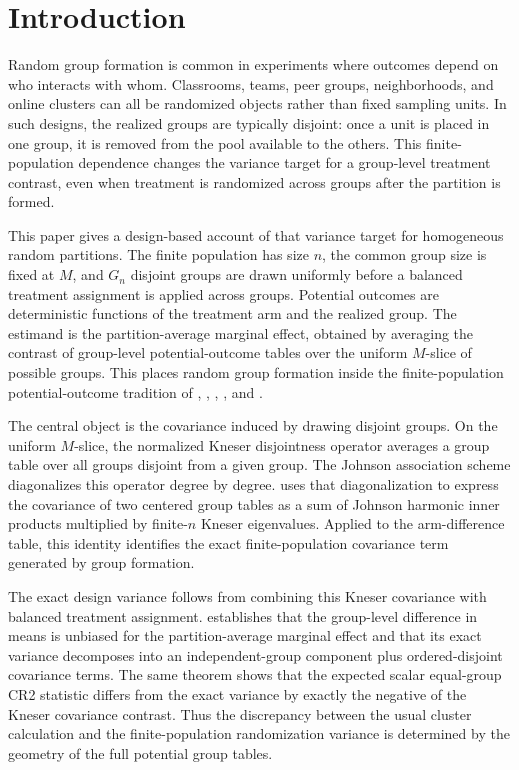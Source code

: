 \documentclass[11pt]{article}
\begin{document}
\section{Introduction}

Random group formation is common in experiments where outcomes depend on who interacts with whom. Classrooms, teams, peer groups, neighborhoods, and online clusters can all be randomized objects rather than fixed sampling units. In such designs, the realized groups are typically disjoint: once a unit is placed in one group, it is removed from the pool available to the others. This finite-population dependence changes the variance target for a group-level treatment contrast, even when treatment is randomized across groups after the partition is formed.

This paper gives a design-based account of that variance target for homogeneous random partitions. The finite population has size \(n\), the common group size is fixed at \(M\), and \(G_n\) disjoint groups are drawn uniformly before a balanced treatment assignment is applied across groups. Potential outcomes are deterministic functions of the treatment arm and the realized group. The estimand is the partition-average marginal effect, obtained by averaging the contrast of group-level potential-outcome tables over the uniform \(M\)-slice of possible groups. This places random group formation inside the finite-population potential-outcome tradition of \citet{Neyman1923}, \citet{Fisher1935}, \citet{Cox1958}, \citet{Rubin1974}, and \citet{Holland1986}.

The central object is the covariance induced by drawing disjoint groups. On the uniform \(M\)-slice, the normalized Kneser disjointness operator averages a group table over all groups disjoint from a given group. The Johnson association scheme diagonalizes this operator degree by degree.  uses that diagonalization to express the covariance of two centered group tables as a sum of Johnson harmonic inner products multiplied by finite-\(n\) Kneser eigenvalues. Applied to the arm-difference table, this identity identifies the exact finite-population covariance term generated by group formation.

The exact design variance follows from combining this Kneser covariance with balanced treatment assignment.  establishes that the group-level difference in means is unbiased for the partition-average marginal effect and that its exact variance decomposes into an independent-group component plus ordered-disjoint covariance terms. The same theorem shows that the expected scalar equal-group CR2 statistic differs from the exact variance by exactly the negative of the Kneser covariance contrast. Thus the discrepancy between the usual cluster calculation and the finite-population randomization variance is determined by the geometry of the full potential group tables.
\end{document}
